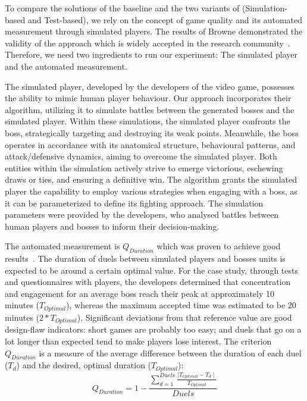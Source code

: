 To compare the solutions of the baseline and the two variants of \ApproachName{} (Simulation-based and Test-based), we rely on the concept of game quality and its automated measurement through simulated players. The results of Browne \etal demonstrated the validity of the approach which is widely accepted in the research community~\cite{browne2010evolutionary}. Therefore, we need two ingredients to run our experiment: The simulated player and the automated measurement.

The simulated player, developed by the developers of the \CaseStudy{} video game, possesses the ability to mimic human player behaviour. Our approach incorporates their algorithm, utilizing it to simulate battles between the generated bosses and the simulated player. Within these simulations, the simulated player confronts the boss, strategically targeting and destroying its weak points. Meanwhile, the boss operates in accordance with its anatomical structure, behavioural patterns, and attack/defensive dynamics, aiming to overcome the simulated player. Both entities within the simulation actively strive to emerge victorious, eschewing draws or ties, and ensuring a definitive win. The algorithm grants the simulated player the capability to employ various strategies when engaging with a boss, as it can be parameterized to define its fighting approach. The simulation parameters were provided by the developers, who analysed battles between human players and bosses to inform their decision-making.

The automated measurement is $Q_{Duration}$ which was proven to achieve good results~\cite{browne2010evolutionary}. The duration of duels between simulated players and bosses units is expected to be around a certain optimal value. For the \CaseStudy{} case study, through tests and questionnaires with players, the developers determined that concentration and engagement for an average boss reach their peak at approximately 10 minutes ($T_{Optimal}$), whereas the maximum accepted time was estimated to be 20 minutes ($2*T_{Optimal}$). Significant deviations from that reference value are good design-flaw indicators: short games are probably too easy; and duels that go on a lot longer than expected tend to make players lose interest. The criterion $Q_{Duration}$ is a measure of the average difference between the duration of each duel ($T_{d}$) and the desired, optimal duration ($T_{Optimal}$):
\begin{equation}
Q_{Duration} =  1 - \frac{\sum\limits_{d=1}^{Duels}\frac{\mid T_{Optimal} - T_{d} \mid}{T_{Optimal}}}{Duels} 
\end{equation}

